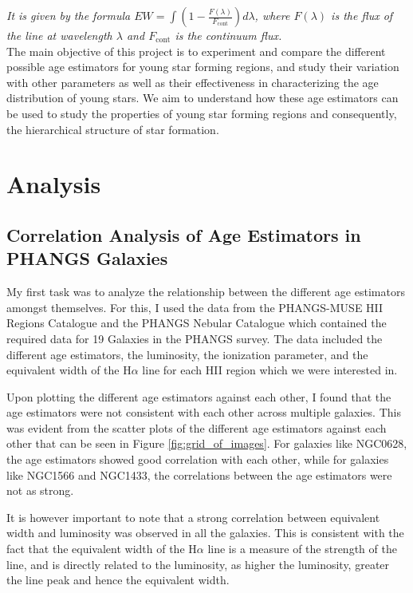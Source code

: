 \documentclass[12pt]{report}
\begin{document}
\textit{ It is given by the formula $EW = \int (1 - \frac{F(\lambda)}{F_{\text{cont}}}) d\lambda$, where $F(\lambda)$ is the flux of the line at wavelength $\lambda$ and $F_{\text{cont}}$ is the continuum flux.}\\

The main objective of this project is to experiment and compare the different possible age estimators for young star forming regions, and study their variation with other parameters as well as their effectiveness in characterizing the age distribution of young stars. We aim to understand how these age estimators can be used to study the properties of young star forming regions and consequently, the hierarchical structure of star formation.

\chapter{Analysis}

\section{Correlation Analysis of Age Estimators in PHANGS Galaxies}

My first task was to analyze the relationship between the different age estimators amongst themselves. For this, I used the data from the PHANGS-MUSE HII Regions Catalogue \cite{santoro2022phangs} and the PHANGS Nebular Catalogue \cite{groves2023phangs} which contained the required data for 19 Galaxies in the PHANGS survey. The data included the different age estimators, the luminosity, the ionization parameter, and the equivalent width of the H$\alpha$ line for each HII region which we were interested in.

Upon plotting the different age estimators against each other, I found that the age estimators were not consistent with each other across multiple galaxies. This was evident from the scatter plots of the different age estimators against each other that can be seen in Figure \ref{fig:grid_of_images}. For galaxies like NGC0628, the age estimators showed good correlation with each other, while for galaxies like NGC1566 and NGC1433, the correlations between the age estimators were not as strong. 

It is however important to note that a strong correlation between equivalent width and luminosity was observed in all the galaxies. This is consistent with the fact that the equivalent width of the H$\alpha$ line is a measure of the strength of the line, and is directly related to the luminosity, as higher the luminosity, greater the line peak and hence the equivalent width.
\end{document}
